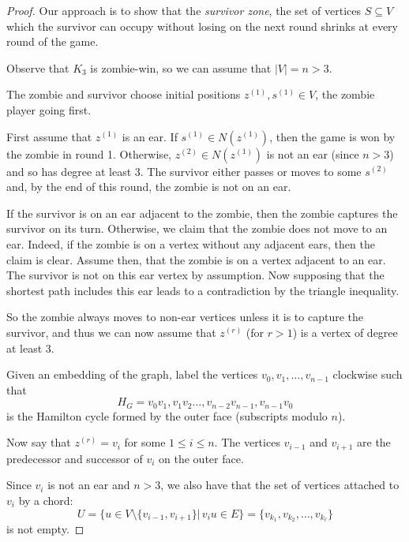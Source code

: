 \documentclass[letterpaper, 10pt]{article}
\begin{document}
\begin{proof}
Our approach is to show that the \emph{survivor zone}, the set of vertices $S \subseteq V$
which the survivor can occupy without losing on the next round shrinks at every round of the game.

Observe that $K_3$ is zombie-win, so we can assume that $|V| = n > 3$.

The zombie and survivor choose initial positions $z^{(1)}, s^{(1)} \in V$,
the zombie player going first.

First assume that $z^{(1)}$ is an ear. If $s^{(1)} \in N(z^{(1)})$, then the game is won by the zombie
in round 1.
Otherwise, $z^{(2)} \in N(z^{(1)})$ is not an ear (since $n > 3$) and so has
degree at least 3. The survivor either passes or moves to some $s^{(2)}$ and, by the end of this
round, the zombie is not on an ear.

If the survivor is on an ear adjacent to the zombie, then the zombie captures the survivor on its turn.
Otherwise, we claim that the zombie does not move to an ear. Indeed, if the zombie is on a vertex
without any adjacent ears, then the claim is clear.
Assume then, that the zombie is on a vertex adjacent to an ear.
The survivor is not on this ear vertex by assumption.
Now supposing that the shortest path includes this ear leads to a contradiction by the triangle
inequality.

So the zombie always moves to non-ear vertices unless it is to capture the survivor,
 and thus we can now assume that $z^{(r)}$ (for $r>1$) is a vertex of degree at least 3.

Given an embedding of the graph, label the vertices $v_0, v_1, \dots, v_{n-1}$ clockwise such that
\[H_G = v_0v_1, v_1v_2 \dots, v_{n-2}v_{n-1}, v_{n-1}v_0\] is the Hamilton cycle formed by
the outer face (subscripts modulo $n$).

Now say that $z^{(r)} = v_i$ for some $1 \leq i \leq n$. The vertices $v_{i-1}$
and $v_{i+1}$ are the predecessor and successor of $v_i$ on the outer face.

Since $v_i$ is not an ear and $n>3$, we also have that the set of vertices attached to $v_i$ by a chord:
\[ U = \{ u \in V\setminus \{v_{i-1}, v_{i+1}\} \vert \, v_i u \in E \} = \{v_{k_1}, v_{k_2}, \dots, v_{k_\ell} \}\]
is not empty.



\end{proof}
\end{document}
